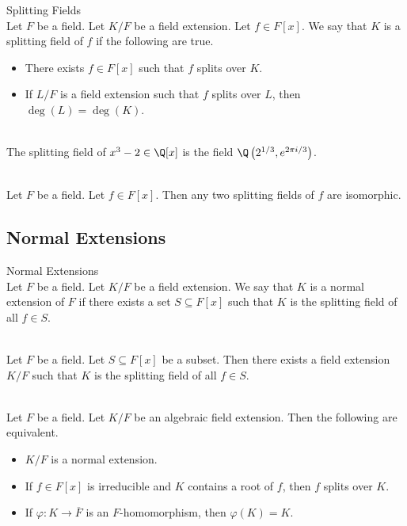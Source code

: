 \documentclass[a4paper]{article}
\begin{document}
\begin{defn}{Splitting Fields}{}\\
Let $F$ be a field. Let $K/F$ be a field extension. Let $f\in F[x]$. We say that $K$ is a splitting field of $f$ if the following are true. 
\begin{itemize}
\item There exists $f\in F[x]$ such that $f$ splits over $K$. 
\item If $L/F$ is a field extension such that $f$ splits over $L$, then $\deg(L)=\deg(K)$. 
\end{itemize}
\end{defn}

\begin{eg}{}{}\\
The splitting field of $x^3-2\in\Q[x]$ is the field $\Q\left(2^{1/3},e^{2\pi i/3}\right)$. 
\end{eg}

\begin{prp}{}{}\\
Let $F$ be a field. Let $f\in F[x]$. Then any two splitting fields of $f$ are isomorphic. 
\end{prp}

\subsection{Normal Extensions}
\begin{defn}{Normal Extensions}{}\\
Let $F$ be a field. Let $K/F$ be a field extension. We say that $K$ is a normal extension of $F$ if there exists a set $S\subseteq F[x]$ such that $K$ is the splitting field of all $f\in S$. 
\end{defn}

\begin{prp}{}{}\\
Let $F$ be a field. Let $S\subseteq F[x]$ be a subset. Then there exists a field extension $K/F$ such that $K$ is the splitting field of all $f\in S$. 
\end{prp}

\begin{prp}{}{}\\
Let $F$ be a field. Let $K/F$ be an algebraic field extension. Then the following are equivalent. 
\begin{itemize}
\item $K/F$ is a normal extension. 
\item If $f\in F[x]$ is irreducible and $K$ contains a root of $f$, then $f$ splits over $K$. 
\item If $\varphi:K\to\overline{F}$ is an $F$-homomorphism, then $\varphi(K)=K$. 
\end{itemize}
\end{prp}
\end{document}
